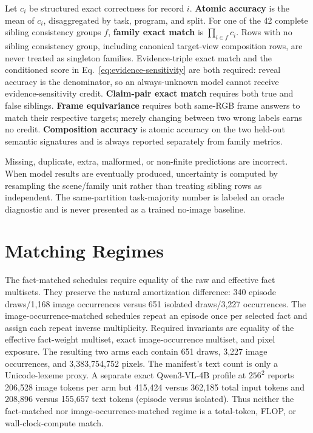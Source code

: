 Let $c_i$ be structured exact correctness for record $i$.
\textbf{Atomic accuracy} is the mean of $c_i$, disaggregated by task, program,
and split.  For one of the 42 complete sibling consistency groups $f$,
\textbf{family exact match} is $\prod_{i\in f}c_i$.  Rows with no sibling
consistency group, including canonical target-view composition rows, are never
treated as singleton families.  Evidence-triple exact match and the conditioned score in
Eq.~\ref{eq:evidence-sensitivity} are both required: reveal accuracy is the
denominator, so an always-unknown model cannot receive evidence-sensitivity
credit.  \textbf{Claim-pair exact match} requires both true and false siblings.
\textbf{Frame equivariance} requires both same-RGB frame answers to match their
respective targets; merely changing between two wrong labels earns no credit.
\textbf{Composition accuracy} is atomic accuracy on the two held-out semantic
signatures and is always reported separately from family metrics.

Missing, duplicate, extra, malformed, or non-finite predictions are incorrect.
When model results are eventually produced, uncertainty is computed by
resampling the scene/family unit rather than treating sibling rows as
independent.  The same-partition task-majority number is labeled an oracle
diagnostic and is never presented as a trained no-image baseline.

\section{Matching Regimes}
\label{app:matching}

The fact-matched schedules require equality of the raw and effective fact
multisets.  They preserve the natural amortization difference: 340 episode
draws/1,168 image occurrences versus 651 isolated draws/3,227 occurrences.
The image-occurrence-matched schedules repeat an episode once per selected
fact and assign each repeat inverse multiplicity.  Required invariants are
equality of the effective fact-weight multiset, exact image-occurrence
multiset, and pixel exposure.  The resulting two arms each contain 651 draws,
3,227 image occurrences, and 3,383,754,752 pixels.  The manifest's text count
is only a Unicode-lexeme proxy.  A separate exact Qwen3-VL-4B profile at
$256^2$ reports 206,528 image tokens per arm but 415,424 versus 362,185 total
input tokens and 208,896 versus 155,657 text tokens (episode versus isolated).
Thus neither the fact-matched nor image-occurrence-matched regime is a
total-token, FLOP, or wall-clock-compute match.

